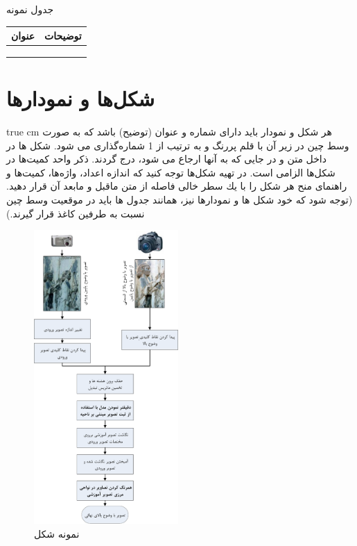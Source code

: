 \documentclass[11pt, twoside]{imsproc}
\begin{document}
\begin{center}
\par
\begingroup%
  \makeatletter
  \def\@captype{table}%
  \makeatother
  \caption{جدول نمونه }%
\endgroup%
\begin{tabular}{|c|p{2in}|} 
\hline عنوان & توضیحات \\ 
\hline  &  \\ 
\hline  &  \\ 
\hline  &  \\ 
\hline 
\end{tabular} 
\end{center}
\section{شكل‌ها و نمودارها}
 true cm
هر شكل و نمودار بايد دارای شماره و عنوان (توضيح) باشد كه به صورت وسط چين در زير آن با قلم پررنگ  و به ترتيب از 1 شماره‌گذاری می شود. شكل ‌ها در داخل متن و در جايی كه به آنها ارجاع می شود، درج گردند. ذكر واحد كميت‌ها در شكل‌ها الزامی است. در تهيه شكل‌ها توجه كنيد كه اندازه اعداد، واژه‌ها، كميت‌ها و راهنمای منح هر شكل را با يك سطر خالی فاصله از متن ماقبل و مابعد آن قرار دهيد. (توجه شود كه خود شكل ها و نمودارها نيز، همانند جدول ها بايد در موقعيت وسط چين نسبت به طرفين كاغذ قرار گيرند.)
\\
\begin{figure}[ht]
\centering
\includegraphics[width=55mm]{Fig-1} 
\caption{\label{shir}\small نمونه شكل }
\end{figure}
\end{document}
